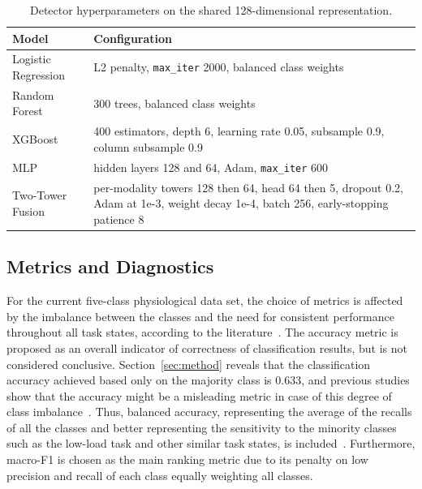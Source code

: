 \documentclass[a4paper,twoside]{article}
\begin{document}
\begin{table}[t]
    \caption{Detector hyperparameters on the shared 128-dimensional representation.}\label{tab:hyper}
    \centering
    \small
    \begin{tabular}{@{}lp{11.5cm}@{}}
        \toprule
        Model               & Configuration                                                                                                                       \\
        \midrule
        Logistic Regression & L2 penalty, \texttt{max\_iter} 2000, balanced class weights                                                                         \\
        Random Forest       & 300 trees, balanced class weights                                                                                                   \\
        \acs{XGBoost}       & 400 estimators, depth 6, learning rate 0.05, subsample 0.9, column subsample 0.9                                                    \\
        \acs{MLP}           & hidden layers 128 and 64, Adam, \texttt{max\_iter} 600                                                                              \\
        Two-Tower Fusion    & per-modality towers 128 then 64, head 64 then 5, dropout 0.2, Adam at 1e-3, weight decay 1e-4, batch 256, early-stopping patience 8 \\
        \bottomrule
    \end{tabular}
\end{table}

\subsection{Metrics and Diagnostics}\label{sec:metrics}

\noindent For the current five-class physiological data set, the choice of metrics is affected by the imbalance between the classes and the need for consistent performance throughout all task states, according to the literature~\cite{sokolova2009systematic}. The accuracy metric is proposed as an overall indicator of correctness of classification results, but is not considered conclusive. Section~\ref{sec:method} reveals that the classification accuracy achieved based only on the majority class is 0.633, and previous studies show that the accuracy might be a misleading metric in case of this degree of class imbalance~\cite{jeni2013imbalanced}. Thus, balanced accuracy, representing the average of the recalls of all the classes and better representing the sensitivity to the minority classes such as the low-load task and other similar task states, is included~\cite{brodersen2010balanced}. Furthermore, macro-F1 is chosen as the main ranking metric due to its penalty on low precision and recall of each class equally weighting all classes.
\end{document}
